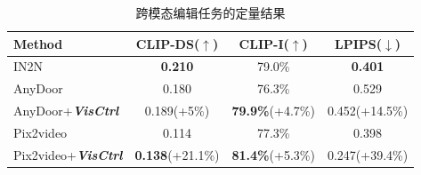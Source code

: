 \begin{table}[t]
\centering
\caption{跨模态编辑任务的定量结果}
\label{tab:3d_video_table}
\setlength{\tabcolsep}{6pt}    %
\renewcommand{\arraystretch}{1.1} %
\footnotesize
\begin{tabular}{lccc}
\toprule
Method & CLIP-DS($\uparrow$) & CLIP-I($\uparrow$) & LPIPS($\downarrow$) \\
\midrule
IN2N~\cite{brooks2022instructpix2pix} & \textbf{0.210} & 79.0\% & \textbf{0.401}\\
AnyDoor~\cite{chen2023anydoor} & 0.180 & 76.3\% & 0.529\\
AnyDoor+\textbf{\textit{VisCtrl}} & 0.189({\scriptsize\color{red}+5\%}) & \textbf{79.9\%}({\scriptsize\color{red}+4.7\%}) & 0.452({\scriptsize\color{red}+14.5\%})\\
\midrule
Pix2video~\cite{ceylan2023pix2video} & 0.114 & 77.3\% & 0.398\\
Pix2video+\textbf{\textit{VisCtrl}} & \textbf{0.138}({\scriptsize\color{red}+21.1\%})  & \textbf{81.4\%}({\scriptsize\color{red}+5.3\%}) & 0.247({\scriptsize\color{red}+39.4\%}) \\
\bottomrule
\end{tabular}
\vspace{-2mm}
\end{table}
